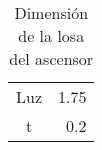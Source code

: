\begin{table}[H]
  \centering
    \begin{tabular}{|c|r|}
    \rowcolor[rgb]{ .2,  .247,  .31} \multicolumn{2}{|c}{\textcolor[rgb]{ 1,  1,  1}{Dimensiones}} \bigstrut[b]\\
    \hline
    \rowcolor[rgb]{ .2,  .247,  .31} \textcolor[rgb]{ 1,  1,  1}{Luz} & \cellcolor[rgb]{ 1,  1,  1}1.75 \\
    \rowcolor[rgb]{ .2,  .247,  .31} \textcolor[rgb]{ 1,  1,  1}{t} & \cellcolor[rgb]{ 1,  1,  1}0.2 \bigstrut[b]\\
\cline{2-2}    \end{tabular}%
  \caption{Dimensión de la losa del ascensor}
  \label{tab:Dim losa}%
\end{table}%
